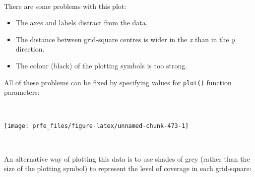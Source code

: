 \documentclass[12pt,a4paper]{book}
\newenvironment{Shaded}{\begin{snugshade}}{\end{snugshade}}
\newcommand{\KeywordTok}[1]{\textcolor[rgb]{0.13,0.29,0.53}{\textbf{#1}}}
\newcommand{\DataTypeTok}[1]{\textcolor[rgb]{0.13,0.29,0.53}{#1}}
\newcommand{\DecValTok}[1]{\textcolor[rgb]{0.00,0.00,0.81}{#1}}
\newcommand{\FloatTok}[1]{\textcolor[rgb]{0.00,0.00,0.81}{#1}}
\newcommand{\StringTok}[1]{\textcolor[rgb]{0.31,0.60,0.02}{#1}}
\newcommand{\OtherTok}[1]{\textcolor[rgb]{0.56,0.35,0.01}{#1}}
\newcommand{\OperatorTok}[1]{\textcolor[rgb]{0.81,0.36,0.00}{\textbf{#1}}}
\newcommand{\NormalTok}[1]{#1}
\theoremstyle{definition}
\theoremstyle{definition}
\theoremstyle{definition}
\theoremstyle{remark}
\begin{document}
~

There are some problems with this plot:

\begin{itemize}
\item
  The axes and labels distract from the data.
\item
  The distance between grid-square centres is wider in the \emph{x} than
  in the \emph{y} direction.
\item
  The colour (black) of the plotting symbols is too strong.
\end{itemize}

All of these problems can be fixed by specifying values for
\texttt{plot()} function parameters:

~

\begin{Shaded}
\end{Shaded}

\begin{center}\texttt{[image: prfe\_files/figure-latex/unnamed-chunk-473-1]} \end{center}

~

An alternative way of plotting this data is to use shades of grey
(rather than the size of the plotting symbol) to represent the level of
coverage in each grid-square:

~

\begin{Shaded}
\end{Shaded}
\end{document}
